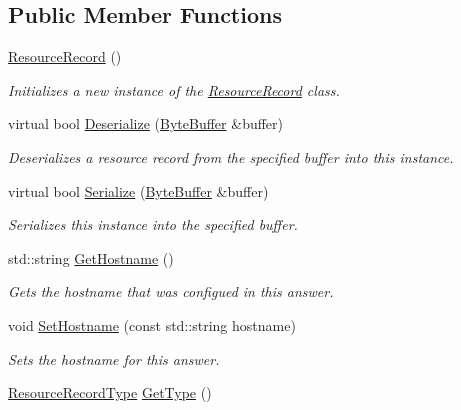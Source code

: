 \subsection*{Public Member Functions}
\begin{DoxyCompactItemize}
\item 
\hyperlink{class_senergy_1_1_dns_1_1_resource_record_a5031132589becf3c4e8e4ecbd6ab4e5d}{Resource\-Record} ()
\begin{DoxyCompactList}\small\item\em Initializes a new instance of the \hyperlink{class_senergy_1_1_dns_1_1_resource_record}{Resource\-Record} class. \end{DoxyCompactList}\item 
virtual bool \hyperlink{class_senergy_1_1_dns_1_1_resource_record_a4426ad69fd06a352835b00d18fd726a7}{Deserialize} (\hyperlink{class_senergy_1_1_byte_buffer}{Byte\-Buffer} \&buffer)
\begin{DoxyCompactList}\small\item\em Deserializes a resource record from the specified buffer into this instance. \end{DoxyCompactList}\item 
virtual bool \hyperlink{class_senergy_1_1_dns_1_1_resource_record_ad76b4f450fc1d7f0bd0bbf72c3f68a11}{Serialize} (\hyperlink{class_senergy_1_1_byte_buffer}{Byte\-Buffer} \&buffer)
\begin{DoxyCompactList}\small\item\em Serializes this instance into the specified buffer. \end{DoxyCompactList}\item 
std\-::string \hyperlink{class_senergy_1_1_dns_1_1_resource_record_a98a7d65be5a756f190247e18a5433661}{Get\-Hostname} ()
\begin{DoxyCompactList}\small\item\em Gets the hostname that was configued in this answer. \end{DoxyCompactList}\item 
void \hyperlink{class_senergy_1_1_dns_1_1_resource_record_a571a18bfcdcc2e5ac0faa2e9cfac57fb}{Set\-Hostname} (const std\-::string hostname)
\begin{DoxyCompactList}\small\item\em Sets the hostname for this answer. \end{DoxyCompactList}\item 
\hyperlink{namespace_senergy_1_1_dns_a590bfd748c955364770f5ce358d9dfe0}{Resource\-Record\-Type} \hyperlink{class_senergy_1_1_dns_1_1_resource_record_a53ff0c81f7f0b79ac69df28a513242e2}{Get\-Type} ()

\end{DoxyCompactItemize}
